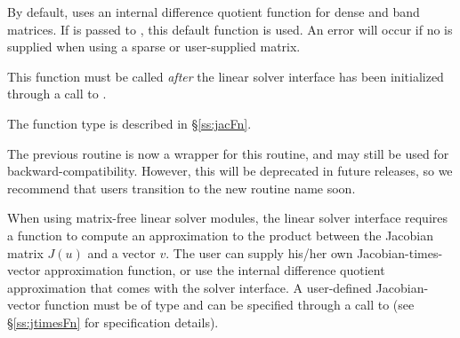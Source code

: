 {
  By default, {\kinls} uses an internal difference quotient function
  for dense and band matrices.  If  is passed to ,
  this default function is used.  An error will occur if no 
  is supplied when using a sparse or user-supplied matrix.

  This function must be called \emph{after} the {\kinls} linear solver
  interface has been initialized through a call to
  .

  The function type  is described in \S\ref{ss:jacFn}.

  The previous routine  is now a wrapper for this
  routine, and may still be used for backward-compatibility.  However,
  this will be deprecated in future releases, so we recommend that
  users transition to the new routine name soon.
}
When using matrix-free linear solver modules, the {\kinls} linear
solver interface requires a function to compute an approximation to
the product between the Jacobian matrix $J(u)$ and a vector $v$.
The user can supply his/her own Jacobian-times-vector approximation function,
or use the internal difference quotient approximation
that comes with the {\kinls} solver interface.  A user-defined Jacobian-vector
function must be of type  and
can be specified through a call to 
(see \S\ref{ss:jtimesFn} for specification details).

